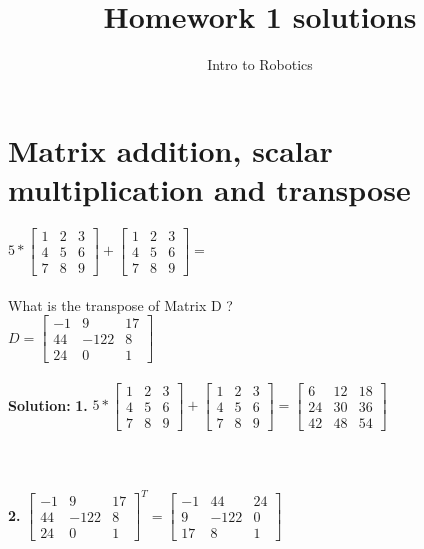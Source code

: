\documentclass{article}
\title{Homework 1 solutions}
\author{Intro to Robotics}
\date{}
\begin{document}
\maketitle

\section{Matrix addition, scalar multiplication and transpose}
$5*
\begin{bmatrix}
1 & 2 & 3\\
4 & 5 & 6\\
7 & 8 & 9
\end{bmatrix}+
\begin{bmatrix}
1 & 2 & 3\\
4 & 5 & 6\\
7 & 8 & 9
\end{bmatrix} =$\\\\
What is the transpose of Matrix D ?\\
$D=
\begin{bmatrix}
-1 & 9 & 17\\
44 & -122 & 8 \\
24 & 0 & 1
\end{bmatrix}$\\\\
\textbf{Solution: }
\textbf{1. }$5*
\begin{bmatrix}
1 & 2 & 3\\
4 & 5 & 6\\
7 & 8 & 9
\end{bmatrix}+
\begin{bmatrix}
1 & 2 & 3\\
4 & 5 & 6\\
7 & 8 & 9
\end{bmatrix} =
\begin{bmatrix}
6 & 12 & 18 \\
24 & 30 & 36 \\
42 & 48 & 54
\end{bmatrix}$\\\\\\\\
\textbf{2. }
$\begin{bmatrix}
-1 & 9 & 17\\
44 & -122 & 8 \\
24 & 0 & 1
\end{bmatrix}^T = \begin{bmatrix}
-1 & 44 & 24\\
9 & -122 & 0\\
17 & 8 & 1
\end{bmatrix} $ 
\end{document}
